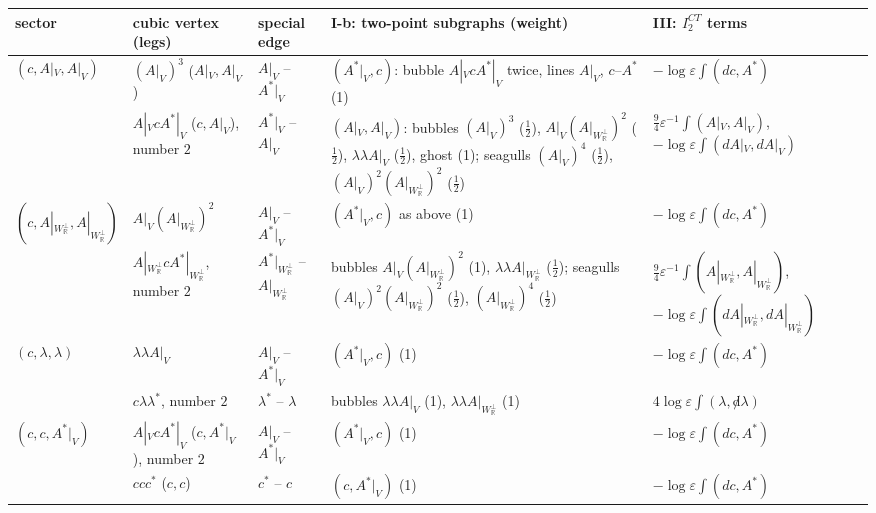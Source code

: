 \begin{tabular}{l|l|l|l|l}
sector & cubic vertex (legs) & special edge & I-b: two-point subgraphs (weight) & III: $I^{CT}_2$ terms \\
\hline
$(c,A|_V,A|_V)$ & $(A|_V)^3$ ($A|_V,A|_V$) & $A|_V$ -- $A^*|_V$ & $(A^*|_V,c)$: bubble $A|_VcA^*|_V$ twice, lines $A|_V$, $c$--$A^*$ (1) & $-\log\varepsilon\int(dc,A^*)$ \\
 & $A|_VcA^*|_V$ ($c,A|_V$), number $2$ & $A^*|_V$ -- $A|_V$ & $(A|_V,A|_V)$: bubbles $(A|_V)^3$ ($\tfrac12$), $A|_V(A|_{W_{\mathbb R}^\perp})^2$ ($\tfrac12$), $\lambda\lambda A|_V$ ($\tfrac12$), ghost (1); seagulls $(A|_V)^4$ ($\tfrac12$), $(A|_V)^2(A|_{W_{\mathbb R}^\perp})^2$ ($\tfrac12$) & $\tfrac94\varepsilon^{-1}\int(A|_V,A|_V)$, $-\log\varepsilon\int(dA|_V,dA|_V)$ \\
\hline
$(c,A|_{W_{\mathbb R}^\perp},A|_{W_{\mathbb R}^\perp})$ & $A|_V(A|_{W_{\mathbb R}^\perp})^2$ & $A|_V$ -- $A^*|_V$ & $(A^*|_V,c)$ as above (1) & $-\log\varepsilon\int(dc,A^*)$ \\
 & $A|_{W_{\mathbb R}^\perp}cA^*|_{W_{\mathbb R}^\perp}$, number $2$ & $A^*|_{W_{\mathbb R}^\perp}$ -- $A|_{W_{\mathbb R}^\perp}$ & bubbles $A|_V(A|_{W_{\mathbb R}^\perp})^2$ (1), $\lambda\lambda A|_{W_{\mathbb R}^\perp}$ ($\tfrac12$); seagulls $(A|_V)^2(A|_{W_{\mathbb R}^\perp})^2$ ($\tfrac12$), $(A|_{W_{\mathbb R}^\perp})^4$ ($\tfrac12$) & $\tfrac94\varepsilon^{-1}\int(A|_{W_{\mathbb R}^\perp},A|_{W_{\mathbb R}^\perp})$, $-\log\varepsilon\int(dA|_{W_{\mathbb R}^\perp},dA|_{W_{\mathbb R}^\perp})$ \\
\hline
$(c,\lambda,\lambda)$ & $\lambda\lambda A|_V$ & $A|_V$ -- $A^*|_V$ & $(A^*|_V,c)$ (1) & $-\log\varepsilon\int(dc,A^*)$ \\
 & $c\lambda\lambda^*$, number $2$ & $\lambda^*$ -- $\lambda$ & bubbles $\lambda\lambda A|_V$ (1), $\lambda\lambda A|_{W_{\mathbb R}^\perp}$ (1) & $4\log\varepsilon\int(\lambda,{\not d}\lambda)$ \\
\hline
$(c,c,A^*|_V)$ & $A|_VcA^*|_V$ ($c,A^*|_V$), number $2$ & $A|_V$ -- $A^*|_V$ & $(A^*|_V,c)$ (1) & $-\log\varepsilon\int(dc,A^*)$ \\
 & $ccc^*$ ($c,c$) & $c^*$ -- $c$ & $(c,A^*|_V)$ (1) & $-\log\varepsilon\int(dc,A^*)$ \\
\end{tabular}

